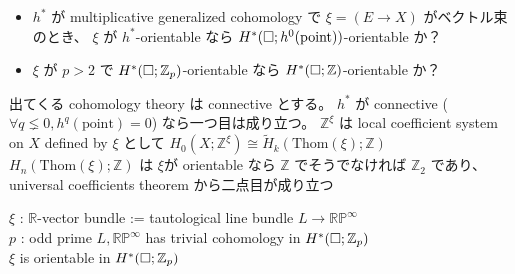 \documentclass[dvipdfmx]{jsarticle}
\begin{document}
\begin{itemize}
  \item \(h^*\) が multiplicative generalized cohomology で \(\xi = (E \to X)\) がベクトル束のとき、 \(\xi\) が \(h^*\)-orientable なら \(H^*(\square; h^0(\text{point}))\)-orientable か？
  \item \(\xi\) が \(p>2\) で \(H^*(\square; \mathbb{Z}_p)\)-orientable なら \(H^*(\square; \mathbb{Z})\)-orientable か？
\end{itemize}

\begin{Theorem}
\itemwhen
  出てくる cohomology theory は connective とする。
\itemprop
  \(h^*\) が connective (\(\forall q\lneq 0, h^q(\text{point})=0\)) なら一つ目は成り立つ。
\itemprop
  \(\mathbb{Z}^{\xi}\) は local coefficient system on \(X\) defined by \(\xi\) として
  \(H_0(X;\mathbb{Z}^{\xi}) \cong \tilde{H}_{k}(\text{Thom}(\xi); \mathbb{Z})\)
\itemprop
  \(H_{n}(\text{Thom}(\xi); \mathbb{Z})\) は \(\xi\)が orientable なら \(\mathbb{Z}\) でそうでなければ \(\mathbb{Z}_2\) であり、 universal coefficients theorem から二点目が成り立つ
\end{Theorem}

\begin{Theorem}
\itemwhen
  \Let \(\xi\) : \(\mathbb{R}\)-vector bundle := tautological line bundle \(L \to \mathbb{RP}^{\infty}\) \\
  \Let \(p\) : odd prime
\itemprop
  \Then \(L,\mathbb{RP}^{\infty}\) has trivial cohomology in \(H^*(\square ;\mathbb{Z}_p)\) \\
  \Then \(\xi\) is orientable in \(H^*(\square ;\mathbb{Z}_p)\) \\
  \Then 
\end{Theorem}
\end{document}
